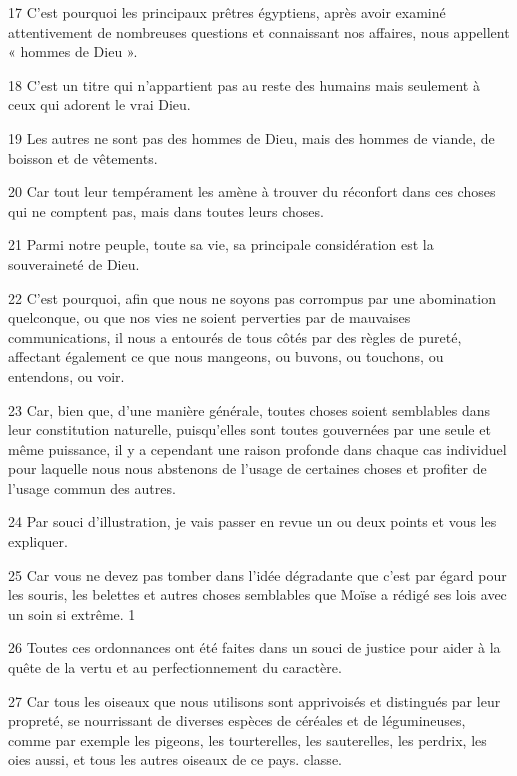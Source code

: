 \par 17 C'est pourquoi les principaux prêtres égyptiens, après avoir examiné attentivement de nombreuses questions et connaissant nos affaires, nous appellent « hommes de Dieu ».

\par 18 C'est un titre qui n'appartient pas au reste des humains mais seulement à ceux qui adorent le vrai Dieu.

\par 19 Les autres ne sont pas des hommes de Dieu, mais des hommes de viande, de boisson et de vêtements.

\par 20 Car tout leur tempérament les amène à trouver du réconfort dans ces choses qui ne comptent pas, mais dans toutes leurs choses.

\par 21 Parmi notre peuple, toute sa vie, sa principale considération est la souveraineté de Dieu.

\par 22 C'est pourquoi, afin que nous ne soyons pas corrompus par une abomination quelconque, ou que nos vies ne soient perverties par de mauvaises communications, il nous a entourés de tous côtés par des règles de pureté, affectant également ce que nous mangeons, ou buvons, ou touchons, ou entendons, ou voir.

\par 23 Car, bien que, d'une manière générale, toutes choses soient semblables dans leur constitution naturelle, puisqu'elles sont toutes gouvernées par une seule et même puissance, il y a cependant une raison profonde dans chaque cas individuel pour laquelle nous nous abstenons de l'usage de certaines choses et profiter de l’usage commun des autres.

\par 24 Par souci d'illustration, je vais passer en revue un ou deux points et vous les expliquer.

\par 25 Car vous ne devez pas tomber dans l'idée dégradante que c'est par égard pour les souris, les belettes et autres choses semblables que Moïse a rédigé ses lois avec un soin si extrême. 1

\par 26 Toutes ces ordonnances ont été faites dans un souci de justice pour aider à la quête de la vertu et au perfectionnement du caractère.

\par 27 Car tous les oiseaux que nous utilisons sont apprivoisés et distingués par leur propreté, se nourrissant de diverses espèces de céréales et de légumineuses, comme par exemple les pigeons, les tourterelles, les sauterelles, les perdrix, les oies aussi, et tous les autres oiseaux de ce pays. classe.

